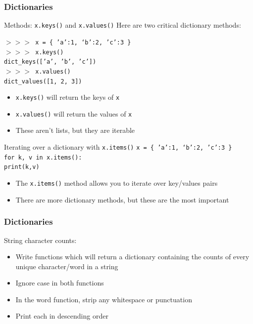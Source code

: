 \documentclass{beamer}
\newcommand{\code}[1]{\texttt{#1}}
\newcommand{\shp}{$>>>$ }
\newcommand{\tab}{\hspace*{22pt}}
\begin{document}
\begin{frame}	
	\frametitle{Dictionaries}
	
	\begin{block}{Methods: \code{x.keys()} and \code{x.values()}}
			Here are two critical dictionary methods:
			
			\vspace{10pt}
			\code{\shp x = \{ 'a':1, `b':2, 'c':3 \} \\
			\shp x.keys() \\
			dict\_keys(['a', 'b', 'c']) \\
			\shp x.values() \\
			dict\_values([1, 2, 3])
			}
		\endminipage\hfill
			\begin{itemize}
				\item \code{x.keys()} will return the keys of \code{x}
				\item \code{x.values()} will return the values of \code{x}
				\item These aren't lists, but they are iterable
			\end{itemize}
		\endminipage\hfill
	\end{block}
	
	\begin{block}{Iterating over a dictionary with \code{x.items()}}
			\code{x = \{ 'a':1, `b':2, 'c':3 \} \\
			for k, v in x.items(): \\
			\tab print(k,v)
			}
		\endminipage\hfill
			\begin{itemize}
				\item The \code{x.items()} method allows you to iterate over key/values pairs
				\item There are more dictionary methods, but these are the most important
			\end{itemize}
		\endminipage\hfill
	\end{block}
	
\end{frame}


\begin{frame}%
	\frametitle{Dictionaries}
	
	\begin{exampleblock}{String character counts:}
		\begin{itemize}
			\item Write functions which will return a dictionary containing the counts of every unique character/word in a string
			\item Ignore case in both functions
			\item In the word function, strip any whitespace or punctuation
			\item Print each in descending order
		\end{itemize}
	\end{exampleblock}
	
\end{frame}
\end{document}
